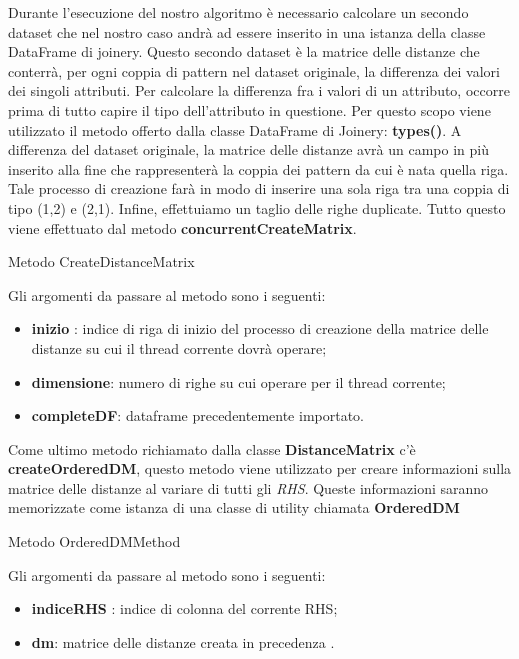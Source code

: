 Durante l'esecuzione del nostro algoritmo è necessario calcolare un secondo dataset che nel nostro caso andrà ad essere inserito in una istanza della classe DataFrame di joinery.
Questo secondo dataset è la matrice delle distanze che conterrà, per ogni coppia di pattern nel dataset originale, la differenza dei valori dei singoli attributi.
Per calcolare la differenza fra i valori di un attributo, occorre prima di tutto capire il tipo dell'attributo in questione. Per questo scopo viene utilizzato il metodo offerto dalla classe DataFrame di Joinery: \textbf{types()}.
A differenza del dataset originale, la matrice delle distanze avrà un campo in più inserito alla fine che rappresenterà la coppia dei pattern da cui è nata quella riga.
Tale processo di creazione farà in modo di inserire una sola riga tra una coppia di tipo (1,2) e (2,1).
Infine, effettuiamo un taglio delle righe duplicate.
Tutto questo viene effettuato dal metodo \textbf{concurrentCreateMatrix}.
\begin{listing}[H]
	\caption{Metodo CreateDistanceMatrix}
	\label{Code:2}
\end{listing}
Gli argomenti da passare al metodo sono i seguenti:
\begin{itemize}
	\item \textbf{inizio} : indice di riga di inizio del processo di creazione della matrice delle distanze su cui il thread corrente dovrà operare;
	\item \textbf{dimensione}: numero di righe su cui operare per il thread corrente;
	\item \textbf{completeDF}: dataframe precedentemente importato.
\end{itemize}
Come ultimo metodo richiamato dalla classe \textbf{DistanceMatrix} c'è \textbf{createOrderedDM}, questo metodo viene utilizzato per creare informazioni sulla matrice delle distanze al variare di tutti gli \emph{RHS}.
Queste informazioni saranno memorizzate come istanza di una classe di utility chiamata \textbf{OrderedDM}
\begin{listing}[H]
	\caption{Metodo OrderedDMMethod}
	\label{Code:3}
\end{listing}
Gli argomenti da passare al metodo sono i seguenti:
\begin{itemize}
	\item \textbf{indiceRHS} : indice di colonna del corrente RHS;
	\item \textbf{dm}: matrice delle distanze creata in precedenza .
\end{itemize}

